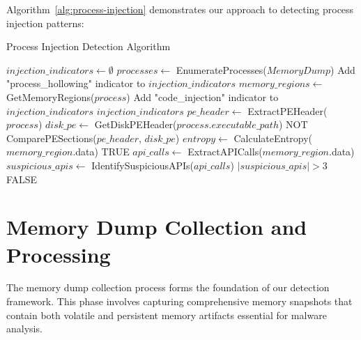 Algorithm~\ref{alg:process-injection} demonstrates our approach to detecting process injection patterns:

\begin{algorithm}[!htbp]
\caption{Process Injection Detection Algorithm}
\label{alg:process-injection}
\begin{algorithmic}[1]
    \State $injection\_indicators \leftarrow \emptyset$
    \State $processes \leftarrow$ EnumerateProcesses($MemoryDump$)
            \State Add "process\_hollowing" indicator to $injection\_indicators$
        \EndIf
        \State $memory\_regions \leftarrow$ GetMemoryRegions($process$)
                \State Add "code\_injection" indicator to $injection\_indicators$
            \EndIf
        \EndFor
    \EndFor
    \Return $injection\_indicators$
\EndProcedure
\Statex
{}
    \State $pe\_header \leftarrow$ ExtractPEHeader($process$)
    \State $disk\_pe \leftarrow$ GetDiskPEHeader($process.executable\_path$)
    \Return NOT ComparePESections($pe\_header$, $disk\_pe$)
\EndProcedure
\Statex
{}
        \State $entropy \leftarrow$ CalculateEntropy($memory\_region$.data)
         
            \Return TRUE
        \EndIf
        \State $api\_calls \leftarrow$ ExtractAPICalls($memory\_region$.data)
        \State $suspicious\_apis \leftarrow$ IdentifySuspiciousAPIs($api\_calls$)
        \Return $|suspicious\_apis| > 3$
    \EndIf
    \Return FALSE
\EndProcedure
\end{algorithmic}
\end{algorithm}

\section{Memory Dump Collection and Processing}
\label{sec:memory-dump-collection}

The memory dump collection process forms the foundation of our detection framework. This phase involves capturing comprehensive memory snapshots that contain both volatile and persistent memory artifacts essential for malware analysis.

